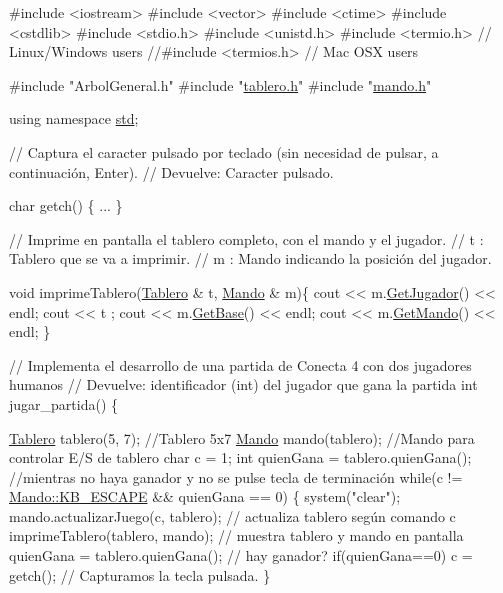 \begin{DoxyCode}
\textcolor{preprocessor}{#include <iostream>}
\textcolor{preprocessor}{#include <vector>}
\textcolor{preprocessor}{#include <ctime>}
\textcolor{preprocessor}{#include <cstdlib>}
\textcolor{preprocessor}{#include <stdio.h>}
\textcolor{preprocessor}{#include <unistd.h>}
\textcolor{preprocessor}{#include <termio.h>}         \textcolor{comment}{// Linux/Windows users}
\textcolor{comment}{//#include <termios.h>      // Mac OSX users}

\textcolor{preprocessor}{#include "ArbolGeneral.h"}
\textcolor{preprocessor}{#include "\hyperlink{tablero_8h}{tablero.h}"}
\textcolor{preprocessor}{#include "\hyperlink{mando_8h}{mando.h}"}

\textcolor{keyword}{using namespace }\hyperlink{namespacestd}{std};

\textcolor{comment}{// Captura el caracter pulsado por teclado (sin necesidad de pulsar, a continuación, Enter).}
\textcolor{comment}{// Devuelve: Caracter pulsado.}

\textcolor{keywordtype}{char} getch() \{
 ...
\}

\textcolor{comment}{// Imprime en pantalla el tablero completo, con el mando y el jugador.}
\textcolor{comment}{// t : Tablero que se va a imprimir.}
\textcolor{comment}{// m : Mando indicando la posición del jugador.}

\textcolor{keywordtype}{void} imprimeTablero(\hyperlink{classTablero}{Tablero} & t, \hyperlink{classMando}{Mando} & m)\{
    cout << m.\hyperlink{classMando_a6ca29d035353a57aba1bd785d8f81c89}{GetJugador}() << endl;
    cout << t ;
    cout << m.\hyperlink{classMando_a656a8d30e54ac1c476e8fab5a7d9e66f}{GetBase}() << endl;
    cout << m.\hyperlink{classMando_ac7ff39c5a065899658f8ee3a335ee50f}{GetMando}() << endl;
\}


\textcolor{comment}{// Implementa el desarrollo de una partida de Conecta 4 con dos jugadores humanos}
\textcolor{comment}{// Devuelve: identificador (int) del jugador que gana la partida}
\textcolor{keywordtype}{int} jugar\_partida() \{

    \hyperlink{classTablero}{Tablero} tablero(5, 7);      \textcolor{comment}{//Tablero 5x7}
    \hyperlink{classMando}{Mando} mando(tablero);       \textcolor{comment}{//Mando para controlar E/S de tablero}
    \textcolor{keywordtype}{char} c = 1;
    \textcolor{keywordtype}{int} quienGana = tablero.quienGana();
    \textcolor{comment}{//mientras no haya ganador y no se pulse tecla de terminación}
    \textcolor{keywordflow}{while}(c != \hyperlink{classMando_a3c4e7465d5b25fcaf8f3b50b444421a3}{Mando::KB\_ESCAPE} && quienGana == 0) \{
        system(\textcolor{stringliteral}{"clear"});
        mando.actualizarJuego(c, tablero);  \textcolor{comment}{// actualiza tablero según comando c }
        imprimeTablero(tablero, mando);     \textcolor{comment}{// muestra tablero y mando en pantalla}
        quienGana = tablero.quienGana();    \textcolor{comment}{// hay ganador?}
        \textcolor{keywordflow}{if}(quienGana==0) c = getch();       \textcolor{comment}{// Capturamos la tecla pulsada.    }
    \}


\end{DoxyCode}

